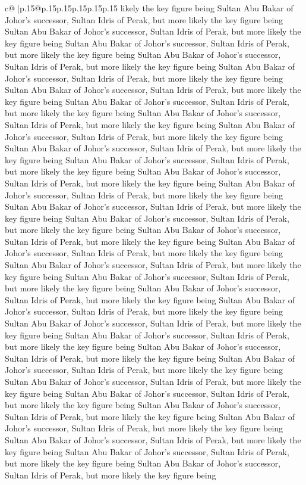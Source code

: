 \documentclass{article}
\begin{document}
{\begin{supertabular}{c@{$\;$}|p{.15\linewidth}@{}p{.15\linewidth}p{.15\linewidth}p{.15\linewidth}p{.15\linewidth}p{.15\linewidth}}
{{{likely the key figure being Sultan Abu Bakar of Johor's successor, Sultan Idris of Perak, but more likely the key figure being Sultan Abu Bakar of Johor's successor, Sultan Idris of Perak, but more likely the key figure being Sultan Abu Bakar of Johor's successor, Sultan Idris of Perak, but more likely the key figure being Sultan Abu Bakar of Johor's successor, Sultan Idris of Perak, but more likely the key figure being Sultan Abu Bakar of Johor's successor, Sultan Idris of Perak, but more likely the key figure being Sultan Abu Bakar of Johor's successor, Sultan Idris of Perak, but more likely the key figure being Sultan Abu Bakar of Johor's successor, Sultan Idris of Perak, but more likely the key figure being Sultan Abu Bakar of Johor's successor, Sultan Idris of Perak, but more likely the key figure being Sultan Abu Bakar of Johor's successor, Sultan Idris of Perak, but more likely the key figure being Sultan Abu Bakar of Johor's successor, Sultan Idris of Perak, but more likely the key figure being Sultan Abu Bakar of Johor's successor, Sultan Idris of Perak, but more likely the key figure being Sultan Abu Bakar of Johor's successor, Sultan Idris of Perak, but more likely the key figure being Sultan Abu Bakar of Johor's successor, Sultan Idris of Perak, but more likely the key figure being Sultan Abu Bakar of Johor's successor, Sultan Idris of Perak, but more likely the key figure being Sultan Abu Bakar of Johor's successor, Sultan Idris of Perak, but more likely the key figure being Sultan Abu Bakar of Johor's successor, Sultan Idris of Perak, but more likely the key figure being Sultan Abu Bakar of Johor's successor, Sultan Idris of Perak, but more likely the key figure being Sultan Abu Bakar of Johor's successor, Sultan Idris of Perak, but more likely the key figure being Sultan Abu Bakar of Johor's successor, Sultan Idris of Perak, but more likely the key figure being Sultan Abu Bakar of Johor's successor, Sultan Idris of Perak, but more likely the key figure being Sultan Abu Bakar of Johor's successor, Sultan Idris of Perak, but more likely the key figure being Sultan Abu Bakar of Johor's successor, Sultan Idris of Perak, but more likely the key figure being Sultan Abu Bakar of Johor's successor, Sultan Idris of Perak, but more likely the key figure being Sultan Abu Bakar of Johor's successor, Sultan Idris of Perak, but more likely the key figure being Sultan Abu Bakar of Johor's successor, Sultan Idris of Perak, but more likely the key figure being Sultan Abu Bakar of Johor's successor, Sultan Idris of Perak, but more likely the key figure being Sultan Abu Bakar of Johor's successor, Sultan Idris of Perak, but more likely the key figure being Sultan Abu Bakar of Johor's successor, Sultan Idris of Perak, but more likely the key figure being Sultan Abu Bakar of Johor's successor, Sultan Idris of Perak, but more likely the key figure being Sultan Abu Bakar of Johor's successor, Sultan Idris of Perak, but more likely the key figure being Sultan Abu Bakar of Johor's successor, Sultan Idris of Perak, but more likely the key figure being Sultan Abu Bakar of Johor's successor, Sultan Idris of Perak, but more likely the key figure being }}}
\end{supertabular}}
\end{document}
